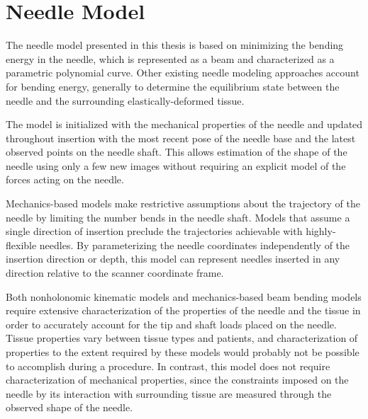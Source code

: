 %
%
%



\chapter{Needle Model}
\label{sec:needlemodel} %

The needle model presented in this thesis is based on minimizing the bending energy in the needle, which is represented as a beam and characterized as a parametric polynomial curve. Other existing needle modeling approaches account for bending energy, generally to determine the equilibrium state between the needle and the surrounding elastically-deformed tissue\cite{roesthuis_modeling_2015, misra_mechanics_2010, abayazid_integrating_2013}.

The model is initialized with the mechanical properties of the needle and updated throughout insertion with the most recent pose of the needle base and the latest observed points on the needle shaft. This allows estimation of the shape of the needle using only a few new images without requiring an explicit model of the forces acting on the needle.

Mechanics-based models make restrictive assumptions about the trajectory of the needle by limiting the number bends in the needle shaft\cite{abayazid_integrating_2013}. Models that assume a single direction of insertion preclude the trajectories achievable with highly-flexible needles. By parameterizing the needle coordinates independently of the insertion direction or depth, this model can represent needles inserted in any direction relative to the scanner coordinate frame.

Both nonholonomic kinematic models and mechanics-based beam bending models require extensive characterization of the properties of the needle and the tissue in order to accurately account for the tip and shaft loads placed on the needle. Tissue properties vary between tissue types and patients, and characterization of properties to the extent required by these models would probably not be possible to accomplish during a procedure. In contrast, this model does not require characterization of mechanical properties, since the constraints imposed on the needle by its interaction with surrounding tissue are measured through the observed shape of the needle.

